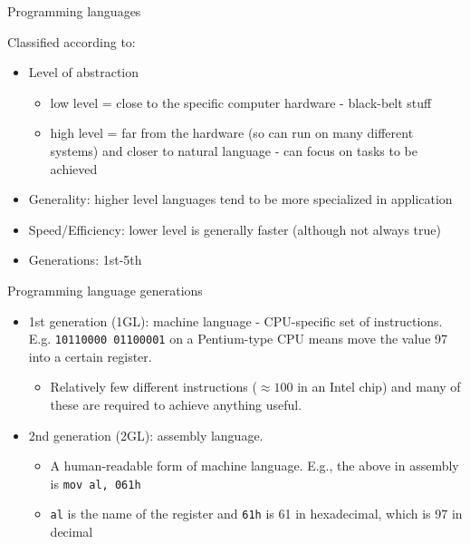 \documentclass[ignorenonframetext,]{beamer}
\providecommand{\tightlist}{%
  \setlength{\itemsep}{0pt}\setlength{\parskip}{0pt}}
\begin{document}
\begin{frame}{Programming languages}

Classified according to:

\begin{itemize}[<+->]
\tightlist
\item
  Level of abstraction

  \begin{itemize}[<+->]
  \tightlist
  \item
    low level = close to the specific computer hardware - black-belt
    stuff
  \item
    high level = far from the hardware (so can run on many different
    systems) and closer to natural language - can focus on tasks to be
    achieved
  \end{itemize}
\item
  Generality: higher level languages tend to be more specialized in
  application
\item
  Speed/Efficiency: lower level is generally faster (although not always
  true)
\item
  Generations: 1st-5th
\end{itemize}

\end{frame}

\begin{frame}[fragile]{Programming language generations}

\begin{itemize}[<+->]
\tightlist
\item
  1st generation (1GL): machine language - CPU-specific set of
  instructions. E.g. \texttt{10110000\ 01100001} on a Pentium-type CPU
  means move the value 97 into a certain register.

  \begin{itemize}[<+->]
  \tightlist
  \item
    Relatively few different instructions (\(\approx100\) in an Intel
    chip) and many of these are required to achieve anything useful.
  \end{itemize}
\item
  2nd generation (2GL): assembly language.

  \begin{itemize}[<+->]
  \tightlist
  \item
    A human-readable form of machine language. E.g., the above in
    assembly is \texttt{mov\ al,\ 061h}
  \item
    \texttt{al} is the name of the register and \texttt{61h} is 61 in
    hexadecimal, which is 97 in decimal
  \end{itemize}
\end{itemize}

\end{frame}
\end{document}
